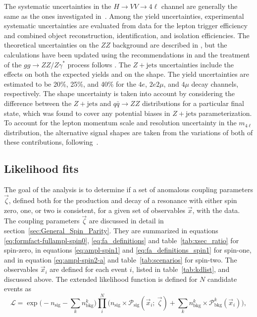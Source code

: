 The systematic uncertainties in the $H \to VV \to 4\ell$ channel are generally the same as the ones investigated in~\cite{Chatrchyan:2013mxa}. Among the yield uncertainties, experimental systematic uncertainties are evaluated from data for the lepton trigger efficiency and combined object reconstruction, identification, and isolation efficiencies.
The theoretical uncertainties on the $ZZ$ background are described in \cite{Chatrchyan:2013mxa}, but the calculations have been updated using the recommendations in \cite{Heinemeyer:2013tqa}
and the treatment of the $gg \to ZZ/Z\gamma^*$ process follows \cite{Khachatryan:2014iha}.
The $Z+\text{jets}$ uncertainties include the effects on both the expected yields and on the shape.
The yield uncertainties are estimated to be 20\%, 25\%, and 40\% for the $4e$, $2e2\mu$, and $4\mu$
decay channels, respectively. The shape uncertainty is taken into account by considering the difference
between the $Z+\text{jets}$ and $q\bar{q} \to ZZ$ distributions for a particular final state, which was found to cover
any potential biases in $Z+\text{jets}$ parameterization.
To account for the lepton momentum scale and resolution uncertainty in
the $m_{4\ell}$ distribution, the alternative signal shapes are taken from the variations of both of these
contributions, following~\cite{Chatrchyan:2013mxa}.

\subsection{Likelihood fits} 
\label{sec:MLfit}

The goal of the analysis is to determine if a set of anomalous coupling parameters $\vec{\zeta}$,
defined both for the production and decay of a resonance with either spin zero, one, or two
is consistent, for a given set of observables $\vec{x}$, with the data.
The coupling parameters $\vec{\zeta}$ are discussed in detail in section~\ref{sec:General_Spin_Parity}.
They are summarized in equations \eqref{eq:formfact-fullampl-spin0}, \eqref{eq:fa_definitions}
and table~\ref{tab:xsec_ratio} for spin-zero, in equations \eqref{eq:ampl-spin1} and \eqref{eq:fa_definitions_spin1} for spin-one, and in equation \eqref{eq:ampl-spin2-a} and table~\ref{tab:scenarios} for spin-two.
The observables $\vec{x}_i$ are defined for each event $i$, listed in table~\ref{tab:kdlist},
and discussed above. The extended likelihood function is defined for $N$ candidate events as
\begin{equation}
\mathcal{L} =  \exp\Big( - n_\text{sig}-\sum_k n_\text{bkg}^k  \Big)
\prod_i^{N} \Big( n_\text{sig} \times\mathcal{P}_\text{sig}(\vec{x}_{i};~\vec{\zeta})
+\sum_k n_\text{bkg}^{k} \times\mathcal{P}_\text{bkg}^k(\vec{x}_{i})
\Big),
\label{eq:likelihood}
\end{equation}

